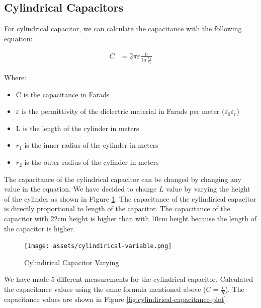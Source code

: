 \newpage
\thispagestyle{plain}

\subsection{Cylindrical Capacitors}

For cylindrical capacitor, we can calculate the capacitance with the following equation:

\begin{align*}
    C &= 2\pi\varepsilon\frac{L}{\ln{\frac{r_2}{r_1}}}
\end{align*}

Where:
\begin{itemize}
    \item C is the capacitance in Farads
    \item $\varepsilon$ is the permittivity of the dielectric material in Farads per meter ($\varepsilon_0\varepsilon_r$)
    \item L is the length of the cylinder in meters
    \item $r_1$ is the inner radius of the cylinder in meters
    \item $r_2$ is the outer radius of the cylinder in meters
\end{itemize}

The capacitance of the cylindrical capacitor can be changed by changing any value in the equation. We have decided to change $L$ value by varying the height of the cylinder as shown in Figure \ref{fig:cylindirical-varying}. The capacitance of the cylindirical capacitor is directly proportional to length of the capacitor. The capacitance of the capacitor with 22cm height is higher than with 10cm height because the length of the capacitor is higher.

\begin{figure}[h]
    \centering
    \texttt{[image: assets/cylindirical-variable.png]}
    \caption{Cylindirical Capacitor Varying}
    \label{fig:cylindirical-varying}
\end{figure}

\newpage
\thispagestyle{plain}

We have made 5 different measurements for the cylindrical capacitor. Calculated the capacitance values using the same formula mentioned above ($C = \frac{t}{R}$). The capacitance values are shown in Figure \ref{fig:cylindirical-capacitance-plot}:

